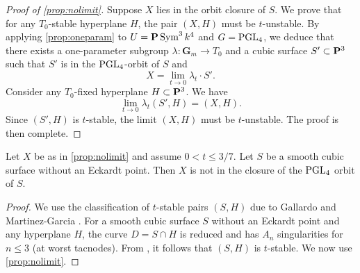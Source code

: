 \documentclass[12pt,reqno]{amsart}
\renewcommand{\k}{k}
\renewcommand{\to}{{\longrightarrow}}
\numberwithin{equation}{section}
\newcommand{\G}{\mathbf G}
\begin{document}
\begin{proof}[Proof of \autoref{prop:nolimit}]
  Suppose $X$ lies in the orbit closure of $S$.
  We prove that for any $T_0$-stable hyperplane $H$, the pair $(X, H)$ must be $t$-unstable.
  By applying \autoref{prop:oneparam} to $U = \P \Sym^3\k^4$ and $G = \PGL_4$, we deduce that there exists a one-parameter subgroup $\lambda \colon \G_m \to T_0$ and a cubic surface $S' \subset \P^3$ such that $S'$ is in the $\PGL_4$-orbit of $S$ and
  \[ X = \lim_{t \to 0} \lambda_t \cdot S'.\]
  Consider any $T_0$-fixed hyperplane $H \subset \P^3$.
  We have
  \[ \lim_{t \to 0} \lambda_t(S', H) = (X, H).\]
  Since $(S', H)$ is $t$-stable, the limit $(X, H)$ must be $t$-unstable.
  The proof is then complete.
\end{proof}
\begin{proposition}\label{cor:nolimit}
  Let $X$ be as in \autoref{prop:nolimit} and assume $0 < t \leq 3/7$.
  Let $S$ be a smooth cubic surface without an Eckardt point.
  Then $X$ is not in the closure of the $\PGL_4$ orbit of $S$.
\end{proposition}
\begin{proof}
  We use the classification of $t$-stable pairs $(S,H)$ due to Gallardo and Martinez-Garcia \cite{gal.mar:19}.
  For a smooth cubic surface $S$ without an Eckardt point and any hyperplane $H$, the curve $D = S \cap H$ is reduced and has $A_n$ singularities for $n \leq 3$ (at worst tacnodes).
  From \cite[Theorem~2]{gal.mar:19}, it follows that $(S, H)$ is $t$-stable.
  We now use \autoref{prop:nolimit}.
\end{proof}
\end{document}
